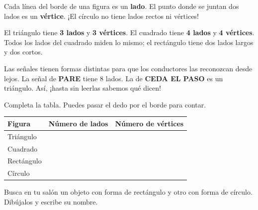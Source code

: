 \documentclass[11pt]{article}
\begin{document}
Cada línea del borde de una figura es un \textbf{lado}. El punto donde se
juntan dos lados es un \textbf{vértice}. ¡El círculo no tiene lados rectos
ni vértices!

\begin{center}
\end{center}

\begin{ejemplo}
El triángulo tiene \textbf{3 lados} y \textbf{3 vértices}. El cuadrado
tiene \textbf{4 lados} y \textbf{4 vértices}. Todos los lados del
cuadrado miden lo mismo; el rectángulo tiene dos lados largos y dos cortos.
\end{ejemplo}

\begin{aplicacion}
Las señales tienen formas distintas para que los conductores las
reconozcan desde lejos. La señal de \textbf{PARE} tiene 8 lados. La de
\textbf{CEDA EL PASO} es un triángulo. Así, ¡hasta sin leerlas sabemos
qué dicen!
\end{aplicacion}

\begin{preguntas}
\pregunta Completa la tabla. Puedes pasar el dedo por el borde para
contar.
\begin{center}
{\renewcommand{\arraystretch}{1.8}
\begin{tabular}{|l|c|c|}
  \hline
  \textbf{Figura} & \textbf{Número de lados} & \textbf{Número de vértices}\\\hline
  Triángulo  & \hspace{2.5cm} & \hspace{2.5cm}\\\hline
  Cuadrado   & & \\\hline
  Rectángulo & & \\\hline
  Círculo    & & \\\hline
\end{tabular}}
\end{center}
\pregunta Busca en tu salón un objeto con forma de rectángulo y otro con
forma de círculo. Dibújalos y escribe su nombre.
\espacio{3.5cm}
\end{preguntas}
\end{document}
